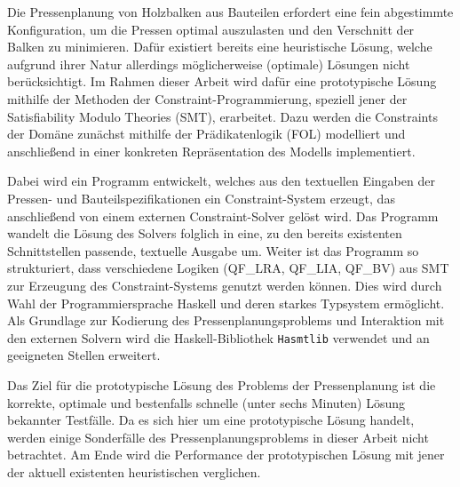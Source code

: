 \abstract
\label{sec:Abstrakt}

Die Pressenplanung von Holzbalken aus Bauteilen erfordert eine fein abgestimmte Konfiguration, um die Pressen optimal auszulasten und den Verschnitt der Balken zu minimieren.
Dafür existiert bereits eine heuristische Lösung, welche aufgrund ihrer Natur allerdings möglicherweise (optimale) Lösungen nicht berücksichtigt.
Im Rahmen dieser Arbeit wird dafür eine prototypische Lösung mithilfe der Methoden der Constraint-Programmierung, speziell jener der Satisfiability Modulo Theories (SMT), erarbeitet.
Dazu werden die Constraints der Domäne zunächst mithilfe der Prädikatenlogik (FOL) modelliert und anschließend in einer konkreten Repräsentation des Modells implementiert.

Dabei wird ein Programm entwickelt, welches aus den textuellen Eingaben der Pressen- und Bauteilspezifikationen ein Constraint-System erzeugt, das anschließend von einem externen Constraint-Solver gelöst wird.
Das Programm wandelt die Lösung des Solvers folglich in eine, zu den bereits existenten Schnittstellen passende, textuelle Ausgabe um.
Weiter ist das Programm so strukturiert, dass verschiedene Logiken (QF\_LRA, QF\_LIA, QF\_BV) aus SMT zur Erzeugung des Constraint-Systems genutzt werden können.
Dies wird durch Wahl der Programmiersprache Haskell und deren starkes Typsystem ermöglicht.
Als Grundlage zur Kodierung des Pressenplanungsproblems und Interaktion mit den externen Solvern
wird die Haskell-Bibliothek \texttt{Hasmtlib} \cite{bruder} verwendet und an geeigneten Stellen erweitert.

Das Ziel für die prototypische Lösung des Problems der Pressenplanung ist die korrekte, optimale und bestenfalls schnelle (unter sechs Minuten) Lösung bekannter Testfälle.
Da es sich hier um eine prototypische Lösung handelt, werden einige Sonderfälle des Pressenplanungsproblems in dieser Arbeit nicht betrachtet.
Am Ende wird die Performance der prototypischen Lösung mit jener der aktuell existenten heuristischen verglichen.
